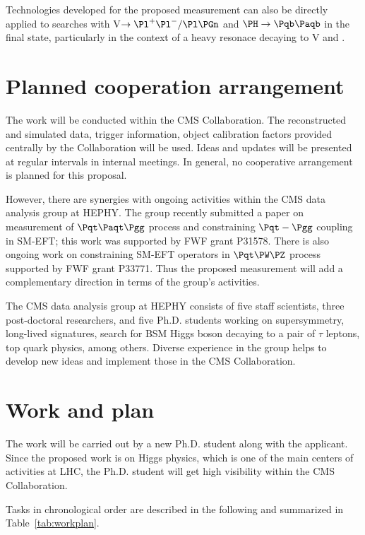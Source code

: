 \documentclass[a4paper,11pt]{article}
\newcommand{\Pb}{{{\Pqb}}\xspace}
\newcommand{\Pt}{{{\Pqt}}\xspace}
\newcommand{\PAb}{{{{\Paqb}}}\xspace}
\newcommand{\PAt}{{{{\Paqt}}}\xspace}
\renewcommand{\PV}{{{{V}}}\xspace}
\begin{document}
{Technologies developed for the proposed measurement can also be directly applied to searches with \PV$\to \Pl^{+}\Pl^{-} / \Pl \Pgn$ and $\PH \to \Pb \PAb$ in the final state, particularly in the context of a heavy resonace decaying to \PV and {\PH}.


\section{Planned cooperation arrangement} 

The work will be conducted within the CMS Collaboration. The reconstructed and simulated data, trigger information, object calibration factors provided centrally by the Collaboration will be used. 
Ideas and updates will be presented at regular intervals in internal meetings. 
In general, no cooperative arrangement is planned for this proposal. 

However, there are synergies with ongoing activities within the CMS data analysis group at HEPHY. 
The group recently submitted a paper on measurement of $\Pt\PAt\Pgg$ process and constraining $\Pt-\Pgg$ coupling in SM-EFT; this work was supported by FWF grant P31578.
There is also ongoing work on constraining SM-EFT operators in $\Pt\PW\PZ$ process supported by FWF grant P33771. 
Thus the proposed measurement will add a complementary direction in terms of the group's activities.

The CMS data analysis group at HEPHY consists of five staff scientists, three post-doctoral researchers, and five Ph.D. students working on supersymmetry, long-lived signatures, search for BSM Higgs boson decaying to a pair of $\tau$ leptons, top quark physics, among others. 
Diverse experience in the group helps to develop new ideas and implement those in the CMS Collaboration.

\section{Work and plan}

The work will be carried out by a new Ph.D. student along with the applicant. 
Since the proposed work is on Higgs physics, which is one of the main centers of activities at LHC, the  
Ph.D. student will get high visibility within the CMS Collaboration.  

Tasks in chronological order are described in the following and summarized in Table~\ref{tab:workplan}.%

\begin{enumerate}


\end{enumerate}}
\end{document}
